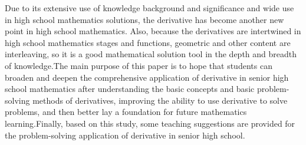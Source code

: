\documentclass{CCNUthesis}
\begin{document}



\frontmatter


\tableofcontents


\begin{abstract}
  由于其具有丰富的知识背景和意义以及在高中数学解题中的广泛使用，导数成为了高中数学大题的又一创新点。又因为导数在高中数学阶段与函数、几何等内容都有交织，因此在知识的深度和广度上，它都是一个很好的数学解题工具。本文研究的主要目的是希望学生能在理解导数的基本概念和基础解题方法后拓宽、深化导数在高中数学中的综合应用，提高运用导数解决难题的能力，进而更好地为未来的数学学习打下基础。最后，基于本研究的发现，对高中导数的解题应用提供一些教学建议。
\end{abstract}

\begin{abstract*}
  Due to its extensive use of knowledge background and significance and wide use in high school mathematics solutions, the derivative has become another new point in high school mathematics. Also, because the derivatives are intertwined in high school mathematics stages and functions, geometric and other content are interleaving, so it is a good mathematical solution tool in the depth and breadth of knowledge.The main purpose of this paper is to hope that students can broaden and deepen the comprehensive application of derivative in senior high school mathematics after understanding the basic concepts and basic problem-solving methods of derivatives, improving the ability to use derivative to solve problems, and then better lay a foundation for future mathematics learning.Finally, based on this study, some teaching suggestions are provided for the problem-solving application of derivative in senior high school.
\end{abstract*}
\end{document}
